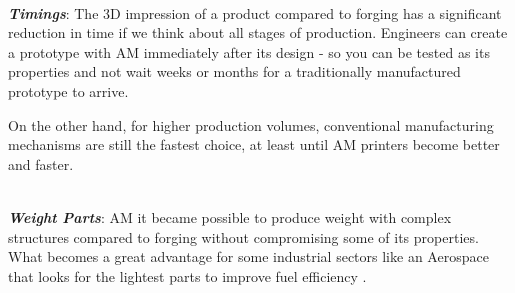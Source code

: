  \vspace{20}\\
  \textbf{\emph{Timings}}: The 3D impression of a product compared to forging has a significant reduction in time if we think about all stages of production. Engineers can create a prototype with AM immediately after its design - so you can be tested as its properties and not wait weeks or months for a traditionally manufactured prototype to arrive.\cite{AMPC}\par
  On the other hand, for higher production volumes, conventional manufacturing mechanisms are still the fastest choice, at least until AM printers become better and faster.
 \cite{attaran2017rise}
  
 \vspace{20}\\
 \textbf{\emph{Weight Parts}}: AM it became possible to produce weight with complex structures compared to forging without compromising some of its properties. What becomes a great advantage for some industrial sectors like an Aerospace that looks for the lightest parts to improve fuel efficiency \cite{huang2016energy}.
 \vspace{20}\\


